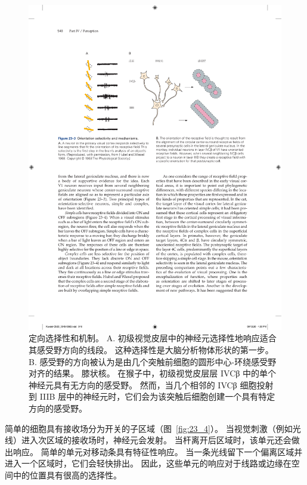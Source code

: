 \begin{figure}[htbp]
	\centering
	\includegraphics[width=0.7\linewidth]{chap23/fig_23_3}
	\caption{定向选择性和机制。
		A. 初级视觉皮层中的神经元选择性地响应适合其感受野方向的线段。
		这种选择性是大脑分析物体形状的第一步\cite{hubel1968receptive}。
		B. 感受野的方向被认为是由几个突触前细胞的圆形中心-环绕感受野对齐的结果。 膝状核。 
		在猴子中，初级视觉皮层层 IVCβ 中的单个神经元具有无方向的感受野。
		然而，当几个相邻的 IVCβ 细胞投射到 IIIB 层中的神经元时，它们会为该突触后细胞创建一个具有特定方向的感受野。}
	\label{fig:23_3}
\end{figure}


简单的细胞具有接收场分为开关的子区域（图~\ref{fig:23_4}）。
当视觉刺激（例如光线）进入次区域的接收场时，神经元会发射。
当杆离开后区域时，该单元还会做出响应。
简单的单元对移动条具有特征性响应。
当一条光线留下一个偏离区域并进入一个区域时，它们会轻快排出。
因此，这些单元的响应对于线路或边缘在空间中的位置具有很高的选择性。


